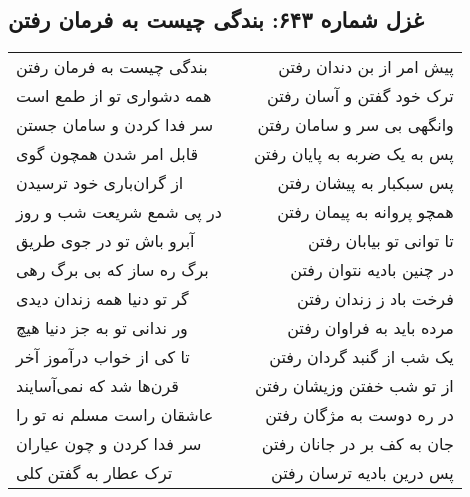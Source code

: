 \begin{center}
\section*{غزل شماره ۶۴۳: بندگی چیست به فرمان رفتن}
\label{sec:643}
\begin{longtable}{l p{0.5cm} r}
بندگی چیست به فرمان رفتن
&&
پیش امر از بن دندان رفتن
\\
همه دشواری تو از طمع است
&&
ترک خود گفتن و آسان رفتن
\\
سر فدا کردن و سامان جستن
&&
وانگهی بی سر و سامان رفتن
\\
قابل امر شدن همچون گوی
&&
پس به یک ضربه به پایان رفتن
\\
از گران‌باری خود ترسیدن
&&
پس سبکبار به پیشان رفتن
\\
در پی شمع شریعت شب و روز
&&
همچو پروانه به پیمان رفتن
\\
آبرو باش تو در جوی طریق
&&
تا توانی تو بیابان رفتن
\\
برگ ره ساز که بی برگ رهی
&&
در چنین بادیه نتوان رفتن
\\
گر تو دنیا همه زندان دیدی
&&
فرخت باد ز زندان رفتن
\\
ور ندانی تو به جز دنیا هیچ
&&
مرده باید به فراوان رفتن
\\
تا کی از خواب درآموز آخر
&&
یک شب از گنبد گردان رفتن
\\
قرن‌ها شد که نمی‌آسایند
&&
از تو شب خفتن وزیشان رفتن
\\
عاشقان راست مسلم نه تو را
&&
در ره دوست به مژگان رفتن
\\
سر فدا کردن و چون عیاران
&&
جان به کف بر در جانان رفتن
\\
ترک عطار به گفتن کلی
&&
پس درین بادیه ترسان رفتن
\\
\end{longtable}
\end{center}
